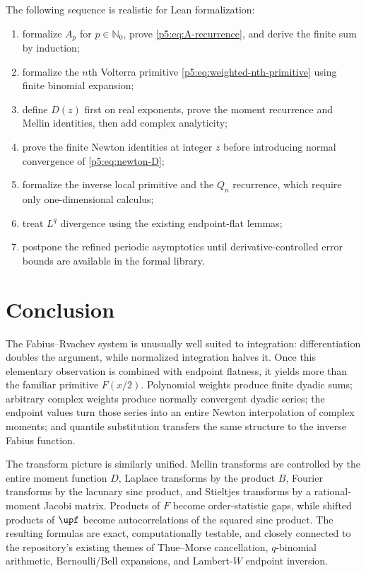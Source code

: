 \documentclass[11pt,oneside]{article}
\theoremstyle{definition}
\theoremstyle{remark}
\newcommand{\N}{\mathbb N}
\newcommand{\1}{\mathbf 1}
\begin{document}
The following sequence is realistic for Lean formalization:
\begin{enumerate}
\item formalize $A_p$ for $p\in\N_0$, prove \eqref{p5:eq:A-recurrence}, and derive the finite sum by induction;
\item formalize the $n$th Volterra primitive \eqref{p5:eq:weighted-nth-primitive} using finite binomial expansion;
\item define $D(z)$ first on real exponents, prove the moment recurrence and Mellin identities, then add complex analyticity;
\item prove the finite Newton identities at integer $z$ before introducing normal convergence of \eqref{p5:eq:newton-D};
\item formalize the inverse local primitive and the $Q_n$ recurrence, which require only one-dimensional calculus;
\item treat $L^q$ divergence using the existing endpoint-flat lemmas;
\item postpone the refined periodic asymptotics until derivative-controlled error bounds are available in the formal library.
\end{enumerate}

\section{Conclusion}

The Fabius--Rvachev system is unusually well suited to integration: differentiation doubles the argument, while normalized integration halves it.  Once this elementary observation is combined with endpoint flatness, it yields more than the familiar primitive $F(x/2)$.  Polynomial weights produce finite dyadic sums; arbitrary complex weights produce normally convergent dyadic series; the endpoint values turn those series into an entire Newton interpolation of complex moments; and quantile substitution transfers the same structure to the inverse Fabius function.

The transform picture is similarly unified.  Mellin transforms are controlled by the entire moment function $D$, Laplace transforms by the product $B$, Fourier transforms by the lacunary sinc product, and Stieltjes transforms by a rational-moment Jacobi matrix.  Products of $F$ become order-statistic gaps, while shifted products of $\upf$ become autocorrelations of the squared sinc product.  The resulting formulas are exact, computationally testable, and closely connected to the repository's existing themes of Thue--Morse cancellation, $q$-binomial arithmetic, Bernoulli/Bell expansions, and Lambert-$W$ endpoint inversion.
\end{document}

